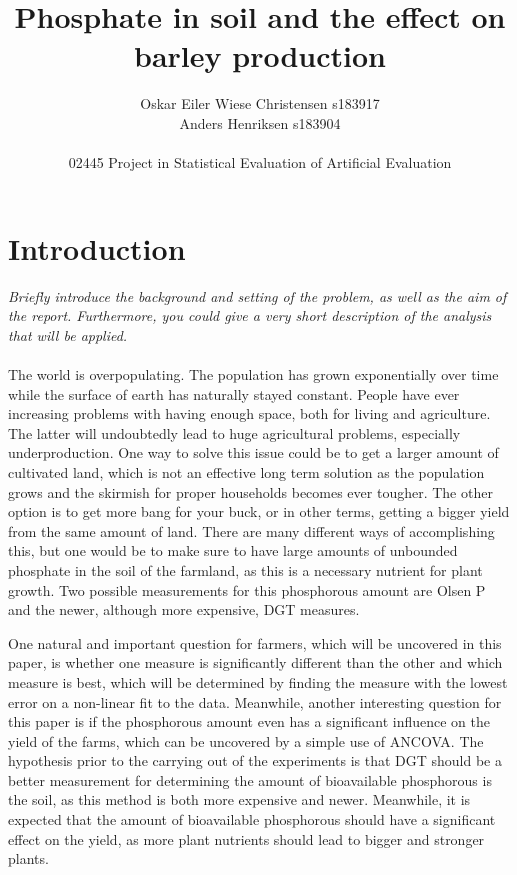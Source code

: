 \documentclass[11pt, fleqn, titlepage]{article}
\title{Phosphate in soil and the effect on barley production}
\author{Oskar Eiler Wiese Christensen s183917 \\ Anders Henriksen s183904 \\ \\ 02445 Project in Statistical Evaluation of Artificial Evaluation}
\date{\today \vspace{2.5cm} \section*{Abstract} \textit{The summary should contain a summary of the problem that  you are working with, which results you got, as well as main conclusions. \\ Don’t get into technical details. The summary should not be very long} \\ Lorem ipsum dolor sit amet, consectetur adipiscing elit, sed do eiusmod tempor incididunt ut labore et dolore magna aliqua. Gravida arcu ac tortor dignissim. Et netus et malesuada fames. Convallis posuere morbi leo urna molestie at elementum eu facilisis. Etiam erat velit scelerisque in dictum non. Mollis nunc sed id semper risus in hendrerit gravida. Cursus euismod quis viverra nibh cras pulvinar mattis nunc sed. Eu tincidunt tortor aliquam nulla. Duis convallis convallis tellus id interdum. Nunc lobortis mattis aliquam faucibus purus in massa tempor. Feugiat sed lectus vestibulum mattis ullamcorper. Malesuada proin libero nunc consequat interdum varius. Sed pulvinar proin gravida hendrerit lectus. Varius morbi enim nunc faucibus a. Ultricies leo integer malesuada nunc vel risus commodo viverra maecenas. Id aliquet lectus proin nibh nisl. Ullamcorper velit sed ullamcorper morbi tincidunt.}
\begin{document}
\maketitle

\section{Introduction}
\textit{Briefly introduce the background and setting of the problem, as well as the aim of the report. Furthermore, you could give a very short description of the analysis that will be applied.} \\ \\
The world is overpopulating. The population has grown exponentially over time while the surface of earth has naturally stayed constant. People have ever increasing problems with having enough space, both for living and agriculture. The latter will undoubtedly lead to huge agricultural problems, especially underproduction. One way to solve this issue could be to get a larger amount of cultivated land, which is not an effective long term solution as the population grows and the skirmish for proper households becomes ever tougher. The other option is to get more bang for your buck, or in other terms, getting a bigger yield from the same amount of land. There are many different ways of accomplishing this, but one would be to make sure to have large amounts of unbounded phosphate in the soil of the farmland, as this is a necessary nutrient for plant growth. Two possible measurements for this phosphorous amount are Olsen P and the newer, although more expensive, DGT measures. 

One natural and important question for farmers, which will be uncovered in this paper, is whether one measure is significantly different than the other and which measure is best, which will be determined by finding the measure with the lowest error on a non-linear fit to the data. Meanwhile, another interesting question for this paper is if the phosphorous amount even has a significant influence on the yield of the farms, which can be uncovered by a simple use of ANCOVA. The hypothesis prior to the carrying out of the experiments is that DGT should be a better measurement for determining the amount of bioavailable phosphorous is the soil, as this method is both more expensive and newer. Meanwhile, it is expected that the amount of bioavailable phosphorous should have a significant effect on the yield, as more plant nutrients should lead to bigger and stronger plants.
\end{document}
